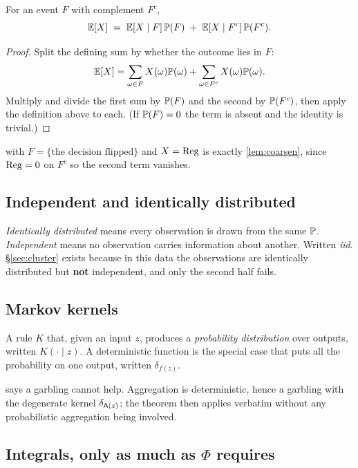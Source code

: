\begin{lemma}
\label{lem:tower}
For an event $F$ with complement $F^c$,
\[
\mathbb{E}[X] \;=\; \mathbb{E}[X\mid F]\,\mathbb{P}(F) \;+\; \mathbb{E}[X\mid F^c]\,\mathbb{P}(F^c).
\]
\end{lemma}
\begin{proof}
Split the defining sum by whether the outcome lies in $F$:
\[
\mathbb{E}[X]=\sum_{\omega\in F}X(\omega)\mathbb{P}(\omega)+\sum_{\omega\in F^c}X(\omega)\mathbb{P}(\omega).
\]
Multiply and divide the first sum by $\mathbb{P}(F)$ and the second by $\mathbb{P}(F^c)$,
then apply the definition above to each. (If $\mathbb{P}(F)=0$ the term is absent and
the identity is trivial.)
\end{proof}

 with $F=\{\text{the decision flipped}\}$ and $X = \mathrm{Reg}$ is
exactly \cref{lem:coarsen}, since $\mathrm{Reg}=0$ on $F^c$ so the second term vanishes.

\subsection{Independent and identically distributed}

\emph{Identically distributed} means every observation is drawn from the same
$\mathbb{P}$. \emph{Independent} means no observation carries information about
another. Written \emph{iid}. §\ref{sec:cluster} exists because in this data the
observations are identically distributed but \textbf{not} independent, and only
the second half fails.

\subsection{Markov kernels}

\begin{definition}
A rule $K$ that, given an input $z$, produces a \emph{probability distribution}
over outputs, written $K(\cdot\mid z)$. A deterministic function is the special
case that puts all the probability on one output, written $\delta_{f(z)}$.
\end{definition}

  says a garbling cannot
help. Aggregation is deterministic, hence a garbling with the degenerate kernel
$\delta_{\mathsf{A}(z)}$; the theorem then applies verbatim without any probabilistic
aggregation being involved.

\subsection{Integrals, only as much as $\Phi$ requires}

